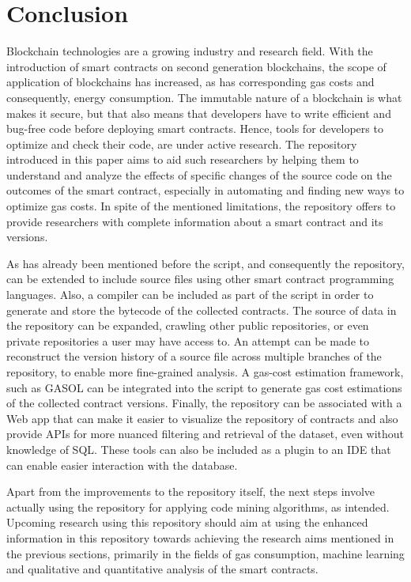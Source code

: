 \documentclass[10pt,conference]{IEEEtran}
\begin{document}
	\section{Conclusion}
	\label{sec:conclusion}
	
	Blockchain technologies are a growing industry and research field. With the introduction of smart contracts on second generation blockchains, the scope of application of blockchains has increased, as has corresponding gas costs and consequently, energy consumption. The immutable nature of a blockchain is what makes it secure, but that also means that developers have to write efficient and bug-free code before deploying smart contracts. Hence, tools for developers to optimize and check their code, are under active research. The repository introduced in this paper aims to aid such researchers by helping them to understand and analyze the effects of specific changes of the source code on the outcomes of the smart contract, especially in automating and finding new ways to optimize gas costs. In spite of the mentioned limitations, the repository offers to provide researchers with complete information about a smart contract and its versions.
	
	As has already been mentioned before the script, and consequently the repository, can be extended to include source files using other smart contract programming languages. Also, a compiler can be included as part of the script in order to generate and store the bytecode of the collected contracts. The source of data in the repository can be expanded, crawling other public repositories, or even private repositories a user may have access to. An attempt can be made to reconstruct the version history of a source file across multiple branches of the repository, to enable more fine-grained analysis. A gas-cost estimation framework, such as GASOL \cite{gasol} can be integrated into the script to generate gas cost estimations of the collected contract versions. Finally, the repository can be associated with a Web app that can make it easier to visualize the repository of contracts and also provide APIs for more nuanced filtering and retrieval of the dataset, even without knowledge of SQL. These tools can also be included as a plugin to an IDE that can enable easier interaction with the database.
	
	Apart from the improvements to the repository itself, the next steps involve actually using the repository for applying code mining algorithms, as intended. Upcoming research using this repository should aim at using the enhanced information in this repository towards achieving the research aims mentioned in the previous sections, primarily in the fields of gas consumption, machine learning and qualitative and quantitative analysis of the smart contracts.
	
	
	
\end{document}

